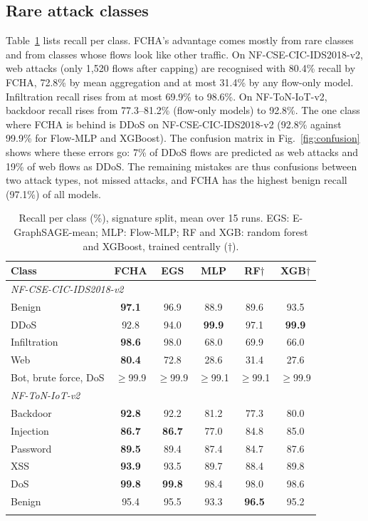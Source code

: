 \documentclass[pdflatex,sn-mathphys-num]{sn-jnl}
\newcommand{\best}[1]{\textbf{#1}}
\begin{document}
\subsection{Rare attack classes}\label{sec:res-class}

Table~\ref{tab:perclass} lists recall per class. FCHA's advantage comes mostly from rare classes and from classes whose flows look like other traffic. On NF-CSE-CIC-IDS2018-v2, web attacks (only 1{,}520 flows after capping) are recognised with 80.4\% recall by FCHA, 72.8\% by mean aggregation and at most 31.4\% by any flow-only model. Infiltration recall rises from at most 69.9\% to 98.6\%. On NF-ToN-IoT-v2, backdoor recall rises from 77.3--81.2\% (flow-only models) to 92.8\%. The one class where FCHA is behind is DDoS on NF-CSE-CIC-IDS2018-v2 (92.8\% against 99.9\% for Flow-MLP and XGBoost). The confusion matrix in Fig.~\ref{fig:confusion} shows where these errors go: 7\% of DDoS flows are predicted as web attacks and 19\% of web flows as DDoS. The remaining mistakes are thus confusions between two attack types, not missed attacks, and FCHA has the highest benign recall (97.1\%) of all models.

\begin{table}[t]
\caption{Recall per class (\%), signature split, mean over 15 runs. EGS: E-GraphSAGE-mean; MLP: Flow-MLP; RF and XGB: random forest and XGBoost, trained centrally ($\dagger$).}\label{tab:perclass}
\begin{tabular*}{\textwidth}{@{\extracolsep\fill}lccccc}
\toprule
Class & FCHA & EGS & MLP & RF$\dagger$ & XGB$\dagger$ \\
\midrule
\multicolumn{6}{l}{\emph{NF-CSE-CIC-IDS2018-v2}}\\
Benign & \best{97.1} & 96.9 & 88.9 & 89.6 & 93.5 \\
DDoS & 92.8 & 94.0 & \best{99.9} & 97.1 & \best{99.9} \\
Infiltration & \best{98.6} & 98.0 & 68.0 & 69.9 & 66.0 \\
Web & \best{80.4} & 72.8 & 28.6 & 31.4 & 27.6 \\
Bot, brute force, DoS & $\geq$99.9 & $\geq$99.9 & $\geq$99.1 & $\geq$99.1 & $\geq$99.9 \\
\midrule
\multicolumn{6}{l}{\emph{NF-ToN-IoT-v2}}\\
Backdoor & \best{92.8} & 92.2 & 81.2 & 77.3 & 80.0 \\
Injection & \best{86.7} & \best{86.7} & 77.0 & 84.8 & 85.0 \\
Password & \best{89.5} & 89.4 & 87.4 & 84.7 & 87.6 \\
XSS & \best{93.9} & 93.5 & 89.7 & 88.4 & 89.8 \\
DoS & \best{99.8} & \best{99.8} & 98.4 & 98.0 & 98.6 \\
Benign & 95.4 & 95.5 & 93.3 & \best{96.5} & 95.2 \\
\botrule
\end{tabular*}
\end{table}
\end{document}
